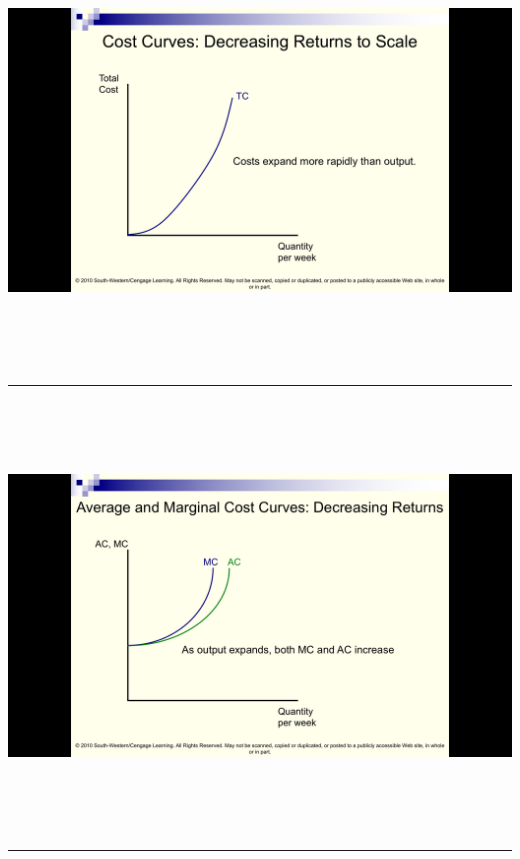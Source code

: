 \documentclass[]{article}
\begin{document}
\includegraphics[height=4.5in]{picsfigs/drsTCcurve.png}

\begin{center}\rule{0.5\linewidth}{\linethickness}\end{center}

\includegraphics[height=4.5in]{picsfigs/drscostcurves}

\begin{center}\rule{0.5\linewidth}{\linethickness}\end{center}
\end{document}
